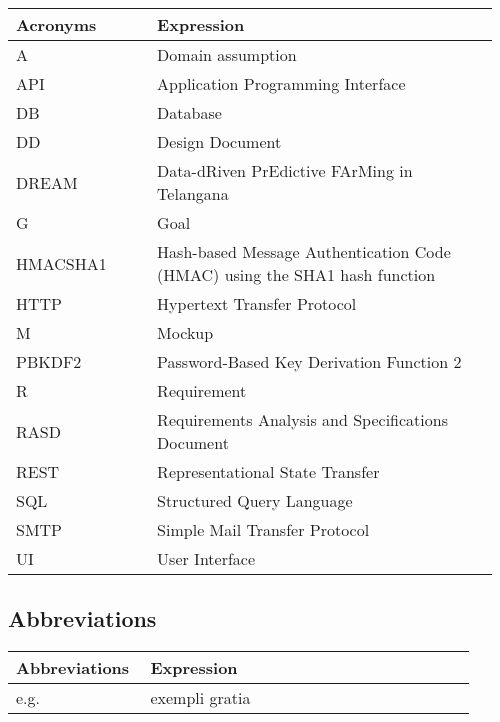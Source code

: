 \begin{center}
	\begin{longtable}{@{}p{0.28\linewidth} p{0.68\linewidth}@{}}
		\toprule
		\textbf{Acronyms}   & \textbf{Expression}\\
		\endfirsthead
		\midrule
		A                   & Domain assumption\\
		API                 & Application Programming Interface\\
		DB                  & Database\\
		DD                  & Design Document\\
		DREAM               & Data-dRiven PrEdictive FArMing in Telangana\\
		G					& Goal\\
		HMACSHA1            & Hash-based Message Authentication Code (HMAC) using the SHA1 hash function \\
		HTTP                & Hypertext Transfer Protocol\\
		M					& Mockup\\
		PBKDF2              & Password-Based Key Derivation Function 2 \\ 
		R                   & Requirement\\
		RASD                & Requirements Analysis and Specifications Document\\
		REST				& Representational State Transfer\\
		SQL                 & Structured Query Language\\
		SMTP                & Simple Mail Transfer Protocol\\
		UI				  	& User Interface\\
		\bottomrule
	\end{longtable}
\end{center}

\subsection{Abbreviations}

\begin{center}
	\begin{longtable}{@{}p{0.28\linewidth} p{0.68\linewidth}@{}}
		\toprule
		\textbf{Abbreviations}  & \textbf{Expression}\\
		\midrule
	    e.g. & exempli gratia\\
		\bottomrule
	\end{longtable}
\end{center}

